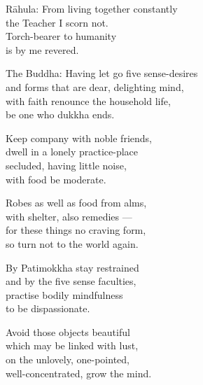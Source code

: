 \begin{MyDescription}{R\=ahula:}
From living together constantly\\
the Teacher I scorn not.\\
Torch-bearer to humanity\\
is by me revered.
\end{MyDescription}   

\begin{MyDescription}{The Buddha:}
Having let go ﬁve sense-desires\\
and forms that are dear, delighting mind,\\
with faith renounce the household life,\\
be one who dukkha ends.
\end{MyDescription}

\begin{MyDescription}{}
Keep company with noble friends,\\
dwell in a lonely practice-place\\
secluded, having little noise,\\
with food be moderate.
\end{MyDescription}

\begin{MyDescription}{}
Robes as well as food from alms,\\
with shelter, also remedies —\\
for these things no craving form,\\
so turn not to the world again.
\end{MyDescription}

\begin{MyDescription}{}
By Patimokkha stay restrained\\
and by the five sense faculties,\\
practise bodily mindfulness\\
to be dispassionate.
\end{MyDescription}

\begin{MyDescription}{}
Avoid those objects beautiful\\
which may be linked with lust,\\
on the unlovely, one-pointed,\\
well-concentrated, grow the mind.
\end{MyDescription}


